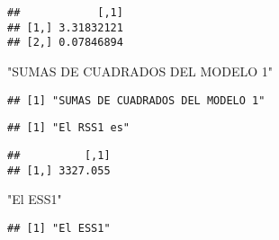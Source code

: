 \documentclass[
]{article}
\newenvironment{Shaded}{\begin{snugshade}}{\end{snugshade}}
\newcommand{\DataTypeTok}[1]{\textcolor[rgb]{0.13,0.29,0.53}{#1}}
\newcommand{\KeywordTok}[1]{\textcolor[rgb]{0.13,0.29,0.53}{\textbf{#1}}}
\newcommand{\NormalTok}[1]{#1}
\newcommand{\OperatorTok}[1]{\textcolor[rgb]{0.81,0.36,0.00}{\textbf{#1}}}
\newcommand{\StringTok}[1]{\textcolor[rgb]{0.31,0.60,0.02}{#1}}
\begin{document}
\begin{Shaded}
\end{Shaded}

\begin{verbatim}
##            [,1]
## [1,] 3.31832121
## [2,] 0.07846894
\end{verbatim}

\begin{Shaded}
\begin{Highlighting}[]
\StringTok{"SUMAS DE CUADRADOS DEL MODELO 1"}
\end{Highlighting}
\end{Shaded}

\begin{verbatim}
## [1] "SUMAS DE CUADRADOS DEL MODELO 1"
\end{verbatim}

\begin{Shaded}
\end{Shaded}

\begin{verbatim}
## [1] "El RSS1 es"
\end{verbatim}

\begin{Shaded}
\end{Shaded}

\begin{verbatim}
##          [,1]
## [1,] 3327.055
\end{verbatim}

\begin{Shaded}
\begin{Highlighting}[]
\StringTok{"El ESS1"}
\end{Highlighting}
\end{Shaded}

\begin{verbatim}
## [1] "El ESS1"
\end{verbatim}
\end{document}
